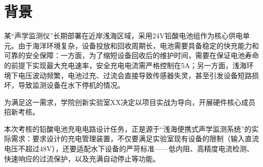 
\section{背景}
某“声学监测仪”长期部署在近岸浅海区域，采用24V铅酸电池组作为核心供电单元。由于海洋环境复杂，设备投放和回收周期长，电池需要具备稳定的快充能力和可靠的安全保障：一方面，为了缩短设备回收后的维护时间，需要在保证电池寿命的前提下实现最大充电速率，安全充电电流需严格控制在5A；另一方面，浅海环境下电压波动频繁，电池过充、过流会直接导致传感器失灵，甚至引发设备短路损坏，导致监测设备在水下停机的情况。

为满足这一需求，学院创新实验室XX决定以项目实战为导向，开展硬件核心成员招新考核。

本次考核的铅酸电池充电电路设计任务，正是源于“浅海便携式声学监测系统”的实际需求：要求设计的充电管理装置，不仅要满足实验室现有设备的限制（输入直流电压不超过48V），还要适配水下设备的严苛标准——低内阻、高精度电流检测、快速响应的过流保护，以及充满自动停止等功能。


